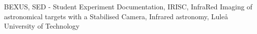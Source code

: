 BEXUS, SED - Student Experiment Documentation, IRISC, InfraRed Imaging of astronomical targets with a Stabilised Camera, Infrared astronomy, Luleå University of Technology



